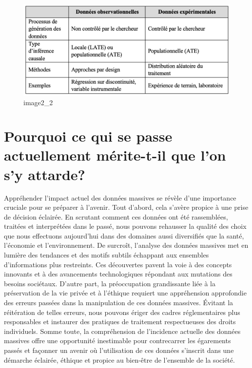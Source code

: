 \documentclass[
  letterpaper,
]{scrbook}
\begin{document}
\begin{figure}

{\centering \includegraphics{images/chapitre1_tableau.png}

}

\caption{image2\_2}

\end{figure}

\hypertarget{pourquoi-ce-qui-se-passe-actuellement-muxe9rite-t-il-que-lon-sy-attarde}{%
\section{Pourquoi ce qui se passe actuellement mérite-t-il que l'on s'y
attarde?}\label{pourquoi-ce-qui-se-passe-actuellement-muxe9rite-t-il-que-lon-sy-attarde}}

Appréhender l'impact actuel des données massives se révèle d'une
importance cruciale pour se préparer à l'avenir. Tout d'abord, cela
s'avère propice à une prise de décision éclairée. En scrutant comment
ces données ont été rassemblées, traitées et interprétées dans le passé,
nous pouvons rehausser la qualité des choix que nous effectuons
aujourd'hui dans des domaines aussi diversifiés que la santé, l'économie
et l'environnement. De surcroît, l'analyse des données massives met en
lumière des tendances et des motifs subtils échappant aux ensembles
d'informations plus restreints. Ces découvertes pavent la voie à des
concepts innovants et à des avancements technologiques répondant aux
mutations des besoins sociétaux. D'autre part, la préoccupation
grandissante liée à la préservation de la vie privée et à l'éthique
requiert une appréhension approfondie des erreurs passées dans la
manipulation de ces données massives. Évitant la réitération de telles
erreurs, nous pouvons ériger des cadres réglementaires plus responsables
et instaurer des pratiques de traitement respectueuses des droits
individuels. Somme toute, la compréhension de l'incidence actuelle des
données massives offre une opportunité inestimable pour contrecarrer les
égarements passés et façonner un avenir où l'utilisation de ces données
s'inscrit dans une démarche éclairée, éthique et propice au bien-être de
l'ensemble de la société.
\end{document}
